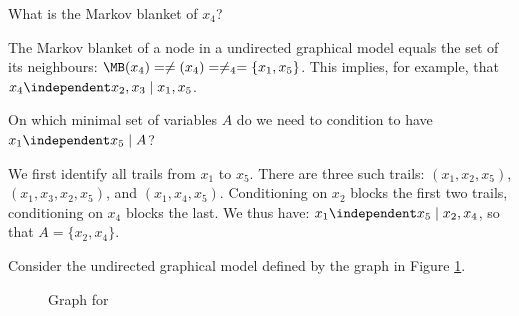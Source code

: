 \begin{exenumerate}
\item What is the Markov blanket of $x_4$? 

  \begin{solution}
  
    The Markov blanket of a node in a undirected graphical model equals the set of its neighbours: $\MB(x_4) = \ne(x_4) = \ne_4 = \{x_1,x_5\}$.  This implies, for example, that
    $x_4 \independent x_2,x_3 \mid x_1,x_5$.
  \end{solution}
  
\item On which minimal set of variables $A$ do we need to condition to have $x_1 \independent x_5 \mid A$?

  \begin{solution}
We first identify all trails from $x_1$ to $x_5$. There are three such trails: $(x_1,x_2,x_5)$, $(x_1, x_3, x_2, x_5)$, and $(x_1,x_4, x_5)$. Conditioning on $x_2$ blocks the first two trails, conditioning on $x_4$ blocks the last. We thus have: $x_1 \independent x_5 \mid x_2,x_4$, so that $A=\{x_2,x_4\}$.
    
\end{solution}

\end{exenumerate}


\label{ex:factorisation-independencies-undirected-graphical-model}
Consider the undirected graphical model defined by the graph in Figure \ref{fig:undirected-graphical-model}.
  \begin{figure}[h]
  \begin{center}
  \end{center}
  \caption{\label{fig:undirected-graphical-model} Graph for }
\end{figure}  

